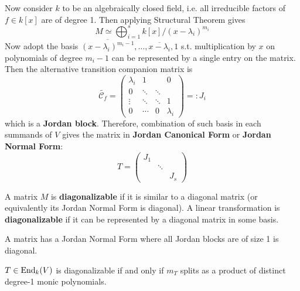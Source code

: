 Now consider $k$ to be an algebraically closed field, i.e. all irreducible factors of $f\in k[x]$ are of degree 1. Then applying Structural Theorem gives
\[
    M \simeq \bigoplus_{i=1}^s k[x]/(x - \lambda_i)^{m_i}
\]
Now adopt the basis $\overline{(x - \lambda_i)^{m_i - 1}}, \ldots, \overline{x - \lambda_i}, 1$ s.t. multiplication by $x$ on polynomials of degree $m_i - 1$ can be represented by a single entry on the matrix. Then the alternative transition companion matrix is
\[
    \widetilde{\mathcal{C}_f} = \begin{pmatrix}
        \lambda_i & 1 & & 0 \\
        0 & \ddots & \ddots & \\
        \vdots & \ddots & \ddots & 1 \\
        0 & \cdots & 0 & \lambda_i
    \end{pmatrix} =: J_i
\]
which is a \textbf{Jordan block}. Therefore, combination of such basis in each summands of $V$ gives the matrix in \textbf{Jordan Canonical Form} or \textbf{Jordan Normal Form}:
\[
    T = \begin{pmatrix}
        J_1 & & \\
        & \ddots & \\
        & & J_s
    \end{pmatrix}
\]

\begin{definition}
    A matrix $M$ is \textbf{diagonalizable} if it is similar to a diagonal matrix (or equivalently its Jordan Normal Form is diagonal). A linear transformation is \textbf{diagonalizable} if it can be represented by a diagonal matrix in some basis. 
\end{definition}

\begin{remark}
    A matrix has a Jordan Normal Form where all Jordan blocks are of size 1 is diagonal.
\end{remark}

\begin{proposition}
    $T\in\mathrm{End}_k(V)$ is diagonalizable if and only if $m_T$ splits as a product of distinct degree-1 monic polynomials.
\end{proposition}

